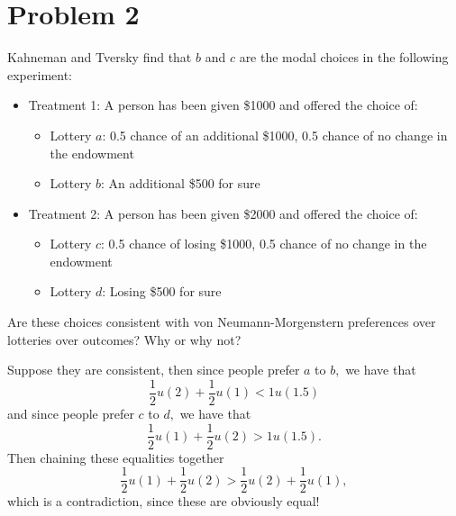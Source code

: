 \documentclass[11pt]{article}
\begin{document}
\newpage
\section*{Problem 2}

\begin{problem}
Kahneman and Tversky find that $b$ and $c$ are the modal choices in the following experiment:
    \begin{itemize}
        \item Treatment 1: A person has been given \$1000 and offered the choice of:
        \begin{itemize}
            \item Lottery $a$: 0.5 chance of an additional \$1000, 0.5 chance of no change in the endowment
            \item Lottery $b$: An additional \$500 for sure
        \end{itemize}
        \item Treatment 2: A person has been given \$2000 and offered the choice of:
        \begin{itemize}
            \item Lottery $c$: 0.5 chance of losing \$1000, 0.5 chance of no change in the endowment
            \item Lottery $d$: Losing \$500 for sure
        \end{itemize}
    \end{itemize}
    Are these choices consistent with von Neumann-Morgenstern preferences over lotteries over outcomes? Why or why not?
    
\end{problem}
\begin{solution}
    Suppose they are consistent, then since people prefer $a$ to $b,$ we have that 
    \[\frac{1}{2}u(2) + \frac{1}{2}u(1) < 1u(1.5)\] and since people prefer $c$ to $d,$ we have that
    \[\frac{1}{2}u(1) + \frac{1}{2}u(2) > 1u(1.5).\] Then chaining these equalities together
    \[\frac{1}{2}u(1) + \frac{1}{2}u(2) > \frac{1}{2}u(2) + \frac{1}{2}u(1),\] which is a contradiction, since these are obviously equal!
\end{solution}

\newpage
\end{document}
